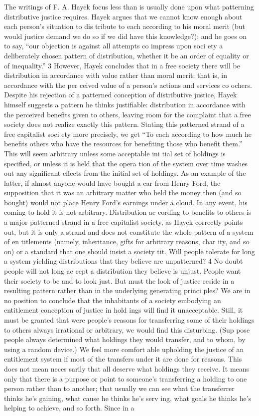 \documentclass[11pt,openany]{book}
\begin{document}
The writings of F. A. Hayek focus less than is usually done upon what patterning distributive justice requires. Hayek argues that we cannot know enough about each person's situation to dis tribute to each according to his moral merit (but would justice demand we do so if we did have this knowledge?); and he goes on to say, ``our objection is against all attempts co impress upon soci ety a deliberately chosen pattern of distribution, whether it be an order of equality or of inequality.'' 3 However, Hayek concludes that in a free society there will be distribution in accordance with value rather than moral merit; that is, in accordance with the per ceived value of a person's actions and services co ochers. Despite his rejection of a patterned conception of distributive justice, Hayek himself suggests a pattern he thinks justifiable: distribution in accordance with the perceived benefits given to others, leaving room for the complaint that a free society does not realize exactly this pattern. Stating this patterned strand of a free capitalist soci ety more precisely, we get ``To each according to how much he benefits others who have the resources for benefiting those who benefit them.'' This will seem arbitrary unless some acceptable ini tial set of holdings is specified, or unless it is held that the opera tion of the system over time washes out any significant effects from the initial set of holdings. As an example of the latter, if almost anyone would have bought a car from Henry Ford, the supposition that it was an arbitrary matter who held the money then (and so bought) would not place Henry Ford's earnings under a cloud. In any event, his coming to hold it is not arbitrary. Distribution ac cording to benefits to others is a major patterned strand in a free capitalist society, as Hayek correctly points out, but it is only a strand and does not constitute the whole pattern of a system of en titlements (namely, inheritance, gifts for arbitrary reasons, char ity, and so on) or a standard that one should insist a society tit. Will people tolerate for long a system yielding distributions that they believe are unpatterned? 4 No doubt people will not long ac cept a distribution they believe is unjust. People want their society to be and to look just. But must the look of justice reside in a resulting pattern rather than in the underlying generating princi ples? We are in no position to conclude that the inhabitants of a society embodying an entitlement conception of justice in hold ings will find it unacceptable. Still, it must be granted that were people's reasons for transferring some of their holdings to others always irrational or arbitrary, we would find this disturbing. (Sup pose people always determined what holdings they would transfer, and to whom, by using a random device.) We feel more comfort able upholding the justice of an entitlement system if most of the transfers under it are done for reasons. This does not mean neces sarily that all deserve what holdings they receive. It means only that there is a purpose or point to someone's transferring a holding to one person rather than to another; that usually we can see what the transferrer thinks he's gaining, what cause he thinks he's serv ing, what goals he thinks he's helping to achieve, and so forth. Since in a 
\end{document}
